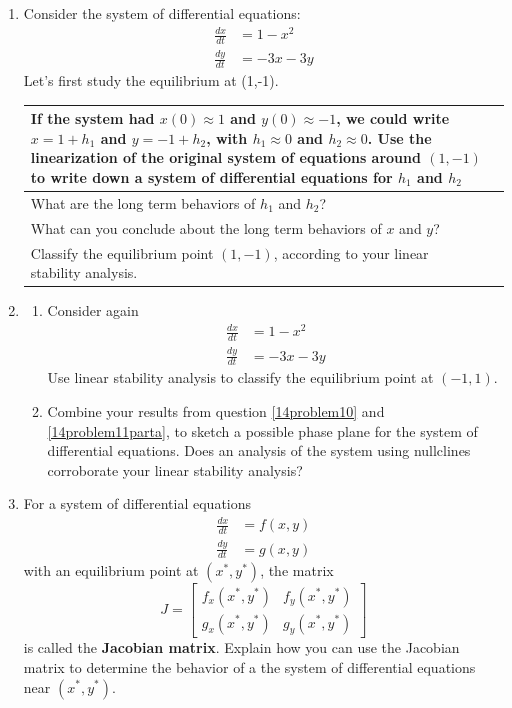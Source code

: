 \begin{enumerate}[resume]
\item Consider the system of differential equations:
\begin{align*}
\frac{dx}{dt} &= 1-x^2 \\
\frac{dy}{dt} &= -3x -3y
\end{align*}
Let's first study the equilibrium at (1,-1). \label{14problem10}

\begin{tabular}{|p{2.5in}|p{3in}|}
\hline
If the system had $x(0) \approx 1$ and $y(0) \approx -1$, we could write $x=1+h_1$ and $y=-1+h_2$, with $h_1 \approx 0$ and $h_2 \approx 0$. Use the linearization of the original system of equations around $(1,-1)$ to write down a system of differential equations for $h_1$ and $h_2$ \vspace{1.5in} &  \\ \hline
What are the long term behaviors of $h_1$ and $h_2$? \vfill &  \\ \hline
What can you conclude about the long term behaviors of $x$ and $y$? \vfill &  \\ \hline
Classify the equilibrium point $(1,-1)$, according to your linear stability analysis. \vfill &  \\ \hline
\end{tabular}

\clearpage

\item \label{14problem11}
\begin{enumerate}
\item Consider again
\begin{align*}
\frac{dx}{dt} &= 1-x^2 \\
\frac{dy}{dt} &= -3x -3y
\end{align*}
Use linear stability analysis to classify the equilibrium point at $(-1,1)$. \label{14problem11parta} \vfill
\item Combine your results from question \ref{14problem10} and \ref{14problem11parta}, to sketch a possible phase plane for the system of differential equations. Does an analysis of the system using nullclines corroborate your linear stability analysis? \label{14problem11partb} \vfill
\end{enumerate}

\clearpage

\item For a system of differential equations
\begin{align*}
\frac{dx}{dt} &= f(x,y) \\
\frac{dy}{dt} &= g(x,y)
\end{align*}
with an equilibrium point at $(x^*,y^*)$, the matrix
\[
J =
\begin{bmatrix}
f_x(x^*,y^*) & f_y(x^*,y^*) \\
g_x(x^*,y^*) & g_y(x^*,y^*)
\end{bmatrix}
\]
is called the \textbf{Jacobian matrix}. Explain how you can use the Jacobian matrix to determine the behavior of a the system of differential equations near $(x^*,y^*)$. \label{14problem12} \vfill


\end{enumerate}
